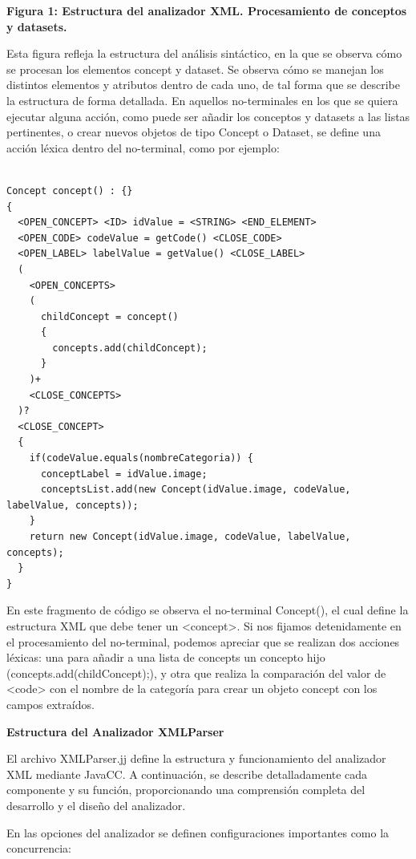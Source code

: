 \textbf{Figura 1: Estructura del analizador XML. Procesamiento de conceptos y datasets.}

Esta figura refleja la estructura del análisis sintáctico, en la que se observa cómo se procesan los elementos concept y dataset. Se observa cómo se manejan los distintos elementos y atributos dentro de cada uno, de tal forma que se describe la estructura de forma detallada. En aquellos no-terminales en los que se quiera ejecutar alguna acción, como puede ser añadir los conceptos y datasets a las listas pertinentes, o crear nuevos objetos de tipo Concept o Dataset, se define una acción léxica dentro del no-terminal, como por ejemplo:

\begin{lstlisting}

Concept concept() : {}
{
  <OPEN_CONCEPT> <ID> idValue = <STRING> <END_ELEMENT>
  <OPEN_CODE> codeValue = getCode() <CLOSE_CODE>
  <OPEN_LABEL> labelValue = getValue() <CLOSE_LABEL>
  (
    <OPEN_CONCEPTS>
    (
      childConcept = concept()
      {
        concepts.add(childConcept);
      }
    )+
    <CLOSE_CONCEPTS>
  )?
  <CLOSE_CONCEPT>
  {
    if(codeValue.equals(nombreCategoria)) {
      conceptLabel = idValue.image;
      conceptsList.add(new Concept(idValue.image, codeValue, labelValue, concepts));
    }
    return new Concept(idValue.image, codeValue, labelValue, concepts);
  }
}

\end{lstlisting}

En este fragmento de código se observa el no-terminal Concept(), el cual define la estructura XML que debe tener un <concept>. Si nos fijamos detenidamente en el procesamiento del no-terminal, podemos apreciar que se realizan dos acciones léxicas: una para añadir a una lista de concepts un concepto hijo (concepts.add(childConcept);), y otra que realiza la comparación del valor de <code> con el nombre de la categoría para crear un objeto concept con los campos extraídos.

\phantom{text}

\noindent \textbf{Estructura del Analizador XMLParser}

\phantom{text}

\noindent El archivo XMLParser.jj define la estructura y funcionamiento del analizador XML mediante JavaCC. A continuación, se describe detalladamente cada componente y su función, proporcionando una comprensión completa del desarrollo y el diseño del analizador.

En las opciones del analizador se definen configuraciones importantes como la concurrencia:

